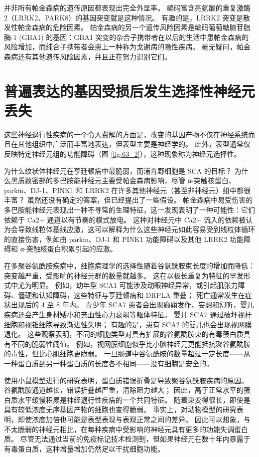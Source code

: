并非所有帕金森病的遗传原因都表现出完全外显率。 编码富含亮氨酸的重复激酶 2（LRRK2、PARK8）的基因突变就是这种情况。 有趣的是，LRRK2 突变是散发性帕金森病的危险因素。 帕金森病的另一个遗传风险因素是编码葡萄糖脑苷脂酶-1 (GBA1) 的基因：GBA1 突变的杂合子携带者在以后的生活中患帕金森病的风险增加，而纯合子携带者会患上一种称为戈谢病的隐性疾病。 毫无疑问，帕金森病还有其他遗传风险因素，并且正在努力识别它们。

\section{普遍表达的基因受损后发生选择性神经元丢失}

这些神经退行性疾病的一个令人费解的方面是，改变的基因产物不仅在神经系统而且在其他组织中广泛而丰富地表达，但表型主要是神经学的。 此外，表型通常仅反映特定神经元组的功能障碍（图 \ref{fig:63_2}），这种现象称为神经元选择性。

为什么纹状体神经元在亨廷顿病中最脆弱，而浦肯野细胞是 SCA 的目标？ 为什么黑质致密部的多巴胺能神经元主要受帕金森病影响，尽管 α-突触核蛋白、parkin、DJ-1、PINK1 和 LRRK2 在许多其他神经元（甚至非神经元）组中都很丰富？ 虽然还没有确定的答案，但已经提出了一些假设。 帕金森病中易受伤害的多巴胺能神经元表现出一种不寻常的生理特征，这一发现表明了一种可能性：它们依赖于 Ca2+ 通道以有节奏的模式放电。 这种对神经元中 Ca2+ 流入的依赖被认为会导致线粒体基线应激，这可以解释为什么这些神经元如此容易受到线粒体循环的直接伤害，例如由 parkin、DJ-1 和 PINK1 功能障碍以及其他 LRRK2 功能障碍和 α-突触核蛋白积累引起的应激。

在多聚谷氨酰胺疾病中，细胞病理学的选择性随着谷氨酰胺束长度的增加而降低：突变越严重，受影响的神经元群的数量就越多。 这在以极长重复为特征的早发形式中尤为明显。 例如，幼年型 SCA1 可能涉及动眼神经异常，或引起肌张力障碍、僵硬和认知障碍，这些特征与亨廷顿病和 DRPLA 重叠； 死亡通常发生在症状出现后的 4 至 8 年内。 青少年 SCA7 患者会出现癫痫发作、妄想和幻听，婴儿疾病还会产生身材矮小和充血性心力衰竭等躯体特征。 婴儿 SCA7 通过破坏视杆细胞和视锥细胞导致渐进性失明； 有趣的是，患有 SCA2 的婴儿也会出现视网膜退化。 这些观察表明，不同的细胞类型对具有扩展的谷氨酰胺束的有毒蛋白质具有不同的脆弱性阈值。 例如，视网膜细胞似乎比小脑神经元更能抵抗聚谷氨酰胺的毒性，但比心肌细胞更脆弱。 一旦肠道中谷氨酰胺的数量超过一定长度——从一种蛋白质到另一种蛋白质的长度各不相同——没有细胞是安全的。

使用小鼠模型进行的研究表明，蛋白质错误折叠是导致聚谷氨酰胺疾病的原因。 谷氨酰胺通道越长，错误折叠越严重，清除阻力越大； 因此，高于正常水平的蛋白质水平缓慢积累是神经退行性疾病的一个共同特征。 随着束变得很长，即使是具有较低浓度无序基因产物的细胞也变得脆弱。 事实上，对动物模型的研究表明，即使浓度加倍也可能是表型表现与表观正常之间的差异。 因此可以想象，与不太脆弱的神经元相比，在每种疾病中受影响的神经元具有更多的功能失调蛋白质。 尽管无法通过当前的免疫标记技术检测到，但如果神经元在数十年内暴露于有毒蛋白质，这种增量增加仍然足以干扰细胞功能。

